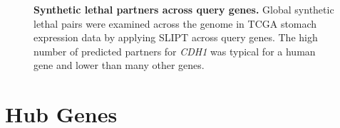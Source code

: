 \begin{figure}[!ht]
  \begin{center}
   \end{center}
   \caption[Synthetic lethal partners across query genes]{\small \textbf{Synthetic lethal partners across query genes.} Global synthetic lethal pairs were examined across the genome in TCGA stomach expression data by applying SLIPT across query genes. The high number of predicted partners for \textit{CDH1} was typical for a human gene and lower than many other genes.
   }
\label{fig:global_SL_stad}
\end{figure}


\FloatBarrier

\clearpage

\section{Hub Genes}


